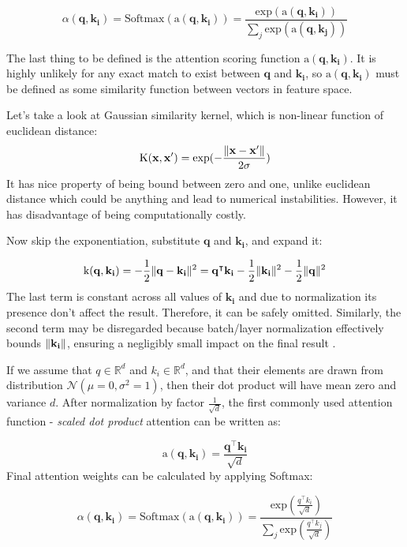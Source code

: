 \[ \alpha(\mathbf{q}, \mathbf{k_i}) = \text{Softmax}(\text{a}(\mathbf{q}, \mathbf{k_i})) = \frac{\text{exp}(\text{a}(\mathbf{q}, \mathbf{k_i}))}{\sum_j \text{exp}(\text{a}(\mathbf{q}, \mathbf{k_j}))} \]

The last thing to be defined is the attention scoring function $\text{a}(\mathbf{q}, \mathbf{k_i})$.
It is highly unlikely for any exact match to exist between $\mathbf{q}$ and $\mathbf{k_i}$, so $\text{a}(\mathbf{q}, \mathbf{k_i})$ must be defined as some similarity function between vectors in feature space.

Let's take a look at Gaussian similarity kernel, which is non-linear function of euclidean distance:
\[\text{K}(\mathbf{x}, \mathbf{x'}) = \text{exp}(-\frac{\Vert\mathbf{x} - \mathbf{x'}\Vert}{2\sigma})\]
It has nice property of being bound between zero and one, unlike euclidean distance which could be anything and lead to numerical instabilities.
However, it has disadvantage of being computationally costly.

Now skip the exponentiation, substitute $\mathbf{q}$ and $\mathbf{k_i}$, and expand it:

\[\text{k}(\mathbf{q}, \mathbf{k_i}) = -\frac{1}{2}\Vert\mathbf{q} - \mathbf{k_i}\Vert^2 = \mathbf{q}^\intercal \mathbf{k_i} - \frac{1}{2}\Vert\mathbf{k_i}\Vert^2 - \frac{1}{2}\Vert\mathbf{q}\Vert^2\]
The last term is constant across all values of $\mathbf{k_i}$ and due to normalization its presence don't affect the result. 
Therefore, it can be safely omitted. 
Similarly, the second term may be disregarded because batch/layer normalization effectively bounds $\Vert\mathbf{k_i}\Vert$, ensuring a negligibly small impact on the final result \cite{d2lAttentionScoring}.

If we assume that $q \in \mathbb{R}^{d}$ and $k_i \in \mathbb{R}^d$, and that their elements are drawn from distribution $\mathcal{N}(\mu=0, \sigma^2=1)$, then their dot product will have mean zero and variance $d$.
After normalization by factor $\frac{1}{\sqrt{d}}$, the first commonly used attention function - \emph{scaled dot product} attention \cite{Vaswani2017} can be written as:

\[\text{a}(\mathbf{q}, {\mathbf{k_i}}) = \frac{\mathbf{q}^\intercal \mathbf{k_i}}{\sqrt{d}}\]
Final attention weights can be calculated by applying Softmax: 

\[\alpha(\mathbf{q}, \mathbf{k_i}) = \text{Softmax}(\text{a}(\mathbf{q}, \mathbf{k_i})) =\frac{\text{exp}(\frac{q^\intercal k_i}{\sqrt{d}})}{\sum_j \text{exp}(\frac{q^\intercal k_j}{\sqrt{d}})} \]

